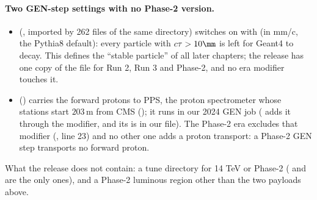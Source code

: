 \paragraph{Two GEN-step settings with no Phase-2 version.}
\begin{itemize}
\item {} (, imported by 262 files of the
  same directory) switches  on with
   (in mm/c, the Pythia8 default): every particle with $c\tau > 10\mm$ is left for Geant4
  to decay. This defines the ``stable particle'' of all later chapters; the release has one copy of the file
  for Run 2, Run 3 and Phase-2, and no era modifier touches it.
\item {} () carries the forward protons to PPS, the proton
  spectrometer whose stations start $203\,$m from CMS (); it runs in our 2024 GEN job
  ( adds it through the  modifier, and its
   is in our file). The Phase-2 era excludes that modifier
  (, line 23) and no other one adds a proton transport: a
  Phase-2 GEN step transports no forward proton.
\end{itemize}
What the release does not contain: a tune directory for 14 TeV or Phase-2 ( and
 are the only ones), and a Phase-2 luminous region other than the two
 payloads above.
